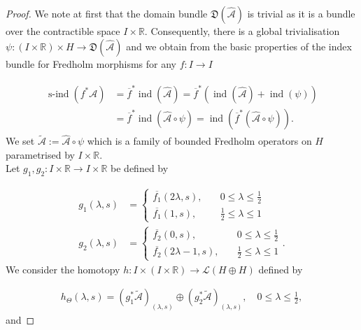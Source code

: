 \documentclass[a4paper,10pt]{article}
\DeclareMathOperator{\ind}{ind}
\DeclareMathOperator{\sind}{s-ind}
\begin{document}
\begin{proof}
We note at first that the domain bundle $\mathfrak{D}(\hat{\mathcal{A}})$ is trivial as it is a bundle over the contractible space $I\times\mathbb{R}$.  Consequently, there is a global trivialisation $\psi:(I\times\mathbb{R})\times H\rightarrow\mathfrak{D}(\hat{\mathcal{A}})$ and we obtain from the basic properties of the index bundle for Fredholm morphisms for any $f:I\rightarrow I$

\begin{align}\label{proofconcatenation}
\begin{split}
\sind(f^\ast\mathcal{A})&=\overline{f}^\ast\ind(\hat{\mathcal{A}})=\overline{f}^\ast(\ind(\hat{\mathcal{A}})+\ind(\psi))\\
&=\overline{f}^\ast\ind(\hat{\mathcal{A}}\circ\psi)=\ind(\overline{f}^\ast(\hat{\mathcal{A}}\circ\psi)).
\end{split}
\end{align}
We set $\tilde{\mathcal{A}}:=\hat{\mathcal{A}}\circ\psi$ which is a family of bounded Fredholm operators on $H$ parametrised by $I\times\mathbb{R}$.\\
Let $g_1,g_2:I\times\mathbb{R}\rightarrow I\times\mathbb{R}$ be defined by

\begin{align*}
g_1(\lambda,s)&=\begin{cases}
\overline{f_1}(2\lambda,s),&\quad 0\leq \lambda\leq\frac{1}{2}\\
\overline{f_1}(1,s),&\quad \frac{1}{2}\leq \lambda\leq 1
\end{cases}\\
g_2(\lambda,s)&=\begin{cases}
\overline{f_2}(0,s),&\quad 0\leq \lambda\leq\frac{1}{2}\\
\overline{f_2}(2\lambda-1,s),&\quad \frac{1}{2}\leq \lambda\leq 1
\end{cases}.
\end{align*}
We consider the homotopy $h:I\times (I\times\mathbb{R})\rightarrow\mathcal{L}(H\oplus H)$ defined by

\begin{align*}
h_\Theta(\lambda,s)= (g^\ast_1\tilde{\mathcal{A}})_{(\lambda,s)}\oplus (g^\ast_2\tilde{\mathcal{A}})_{(\lambda,s)},\quad 0\leq \lambda\leq \frac{1}{2},
\end{align*}
and


\end{proof}
\end{document}
